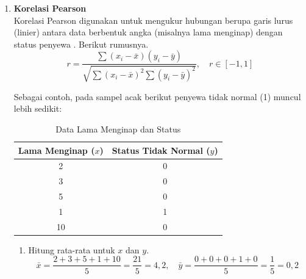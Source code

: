\begin{enumerate}
    Berdasarkan rincian nilai $O_i$ dan $E_i$ tersebut, perhitungan total nilai $\chi^2$ adalah sebagai berikut.
    $$
    \chi^2 = \frac{(40 - 44)^2}{44} + \frac{(15 - 11)^2}{11} + \frac{(40 - 36)^2}{36} + \frac{(5 - 9)^2}{9}
    $$
    $$
    \chi^2 \approx 0{,}36 + 1{,}45 + 0{,}44 + 1{,}77 = 4{,}02
    $$

    Semakin besar angka $\chi^2$, semakin kuat hubungan antara fitur tersebut dengan target hasil. Nilai $p$ dari distribusi hasil ini kemudian bisa digunakan untuk memastikan apakah hubungan tersebut benar-benar dapat dipercaya secara statistik (signifikan).

    \item \textbf{Korelasi Pearson} \\
    Korelasi Pearson digunakan untuk mengukur hubungan berupa garis lurus (linier) antara data berbentuk angka (misalnya lama menginap) dengan status penyewa \cite{han2011data}. Berikut rumusnya.
    $$
    r = \frac{\sum (x_i - \bar{x})(y_i - \bar{y})}{\sqrt{\sum (x_i - \bar{x})^2 \sum (y_i - \bar{y})^2}}, \quad r \in [-1,1]
    $$
    
    Sebagai contoh, pada sampel acak berikut penyewa tidak normal (1) muncul lebih sedikit:
    \begin{table}[H]
    \centering
    \caption{Data Lama Menginap dan Status}
    \begin{tabular}{|c|c|}
    \hline
    \textbf{Lama Menginap} ($x$) & \textbf{Status Tidak Normal} ($y$) \\
    \hline
    2 & 0 \\
    3 & 0 \\
    5 & 0 \\
    1 & 1 \\
    10 & 0 \\
    \hline
    \end{tabular}
    \end{table}
    
    \begin{enumerate}
        \item Hitung rata-rata untuk $x$ dan $y$.
        $$
        \bar{x} = \frac{2 + 3 + 5 + 1 + 10}{5} = \frac{21}{5} = 4{,}2, \quad
        \bar{y} = \frac{0 + 0 + 0 + 1 + 0}{5} = \frac{1}{5} = 0{,}2
        $$
    

\end{enumerate}
\end{enumerate}
